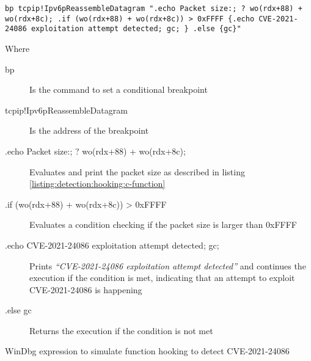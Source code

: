 \documentclass{report}
\begin{document}
\begin{listing}[H]
    \begin{verbatim}
bp tcpip!Ipv6pReassembleDatagram ".echo Packet size:; ? wo(rdx+88) + wo(rdx+8c); .if (wo(rdx+88) + wo(rdx+8c)) > 0xFFFF {.echo CVE-2021-24086 exploitation attempt detected; gc; } .else {gc}"
\end{verbatim}

Where

\begin{description}
    \item[bp] Is the command to set a conditional breakpoint
    \item[tcpip!Ipv6pReassembleDatagram] Is the address of the breakpoint
    \item[.echo Packet size:; ? wo(rdx+88) + wo(rdx+8c);] Evaluates and print the packet size as described in listing \ref{listing:detection:hooking:c-function}
    \item[.if (wo(rdx+88) + wo(rdx+8c)) > 0xFFFF] Evaluates a condition checking if the packet size is larger than 0xFFFF
    \item[{.echo CVE-2021-24086 exploitation attempt detected; gc; }] Prints \emph{``CVE-2021-24086 exploitation attempt detected''} and continues the execution if the condition is met, indicating that an attempt to exploit CVE-2021-24086 is happening
    \item[.else {gc}] Returns the execution if the condition is not met
\end{description}
\caption{WinDbg expression to simulate function hooking to detect CVE-2021-24086}
\label{listing:detection:hooking:windbg-bp}
\end{listing}
\end{document}
